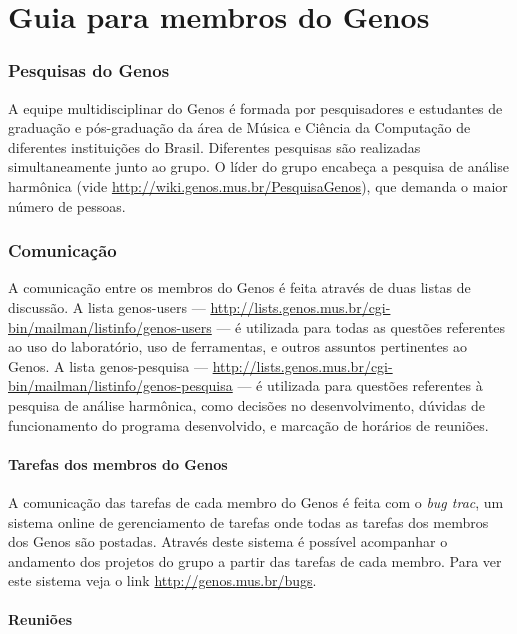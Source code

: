 \documentclass[12pt,brazil]{book}
\begin{document}
\part{Guia para membros do Genos}
\label{part:guia-para-membros}

\section{Pesquisas do Genos}
\label{sec:pesquisas-do-genos}

A equipe multidisciplinar do Genos é formada por pesquisadores e
estudantes de graduação e pós-graduação da área de Música e Ciência da
Computação de diferentes instituições do Brasil. Diferentes pesquisas
são realizadas simultaneamente junto ao grupo. O líder do grupo
encabeça a pesquisa de análise harmônica (vide
\url{http://wiki.genos.mus.br/PesquisaGenos}), que demanda o maior
número de pessoas.

\section{Comunicação}
\label{sec:comunicacao}

A comunicação entre os membros do Genos é feita através de duas listas
de discussão. A lista genos-users ---
\url{http://lists.genos.mus.br/cgi-bin/mailman/listinfo/genos-users}
--- é utilizada para todas as questões referentes ao uso do
laboratório, uso de ferramentas, e outros assuntos pertinentes ao
Genos. A lista genos-pesquisa ---
\url{http://lists.genos.mus.br/cgi-bin/mailman/listinfo/genos-pesquisa}
--- é utilizada para questões referentes à pesquisa de análise
harmônica, como decisões no desenvolvimento, dúvidas de funcionamento
do programa desenvolvido, e marcação de horários de reuniões.

\subsection{Tarefas dos membros do Genos}
\label{sec:tarefas-dos-membros}

A comunicação das tarefas de cada membro do Genos é feita com o
\textit{bug trac}, um sistema online de gerenciamento de tarefas onde
todas as tarefas dos membros dos Genos são postadas. Através deste
sistema é possível acompanhar o andamento dos projetos do grupo a
partir das tarefas de cada membro. Para ver este sistema veja o link
\url{http://genos.mus.br/bugs}.

\subsection{Reuniões}
\label{sec:reunioes}
\end{document}
